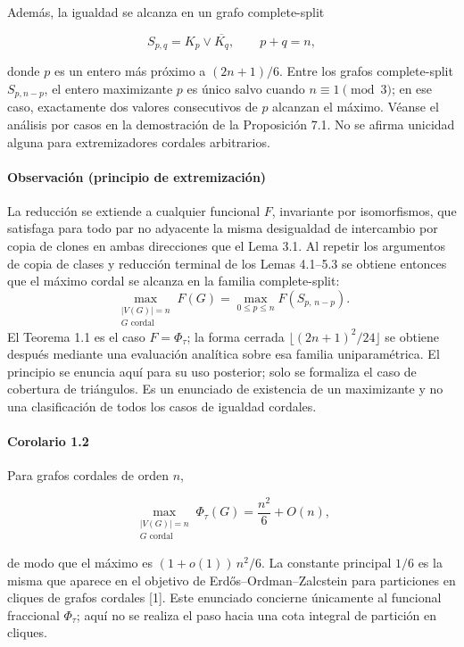 \documentclass[spanish,11pt,a4paper]{article}
\begin{document}
Además, la igualdad se alcanza en un grafo complete-split

\[
S_{p,q}=K_p\vee\overline{K_q},
\qquad
p+q=n,
\]

donde \(p\) es un entero más próximo a \((2n+1)/6\). Entre los grafos
complete-split \(S_{p,n-p}\), el entero maximizante \(p\) es único salvo
cuando \(n\equiv1\pmod3\); en ese caso, exactamente dos valores
consecutivos de \(p\) alcanzan el máximo. Véanse el análisis por casos
en la demostración de la Proposición 7.1. No se afirma unicidad alguna
para extremizadores cordales arbitrarios.

\paragraph{Observación (principio de
extremización)}\label{observaciuxf3n-principio-de-extremizaciuxf3n}

La reducción se extiende a cualquier funcional \(F\), invariante por
isomorfismos, que satisfaga para todo par no adyacente la misma
desigualdad de intercambio por copia de clones en ambas direcciones que
el Lema 3.1. Al repetir los argumentos de copia de clases y reducción
terminal de los Lemas 4.1--5.3 se obtiene entonces que el máximo cordal
se alcanza en la familia complete-split: \[
\max_{\substack{|V(G)|=n\\ G\text{ cordal}}}F(G)=\max_{0\le p\le n}F(S_{p,\,n-p}).
\] El Teorema 1.1 es el caso \(F=\Phi_\tau\); la forma cerrada
\(\lfloor(2n+1)^2/24\rfloor\) se obtiene después mediante una evaluación
analítica sobre esa familia uniparamétrica. El principio se enuncia aquí
para su uso posterior; solo se formaliza el caso de cobertura de
triángulos. Es un enunciado de existencia de un maximizante y no una
clasificación de todos los casos de igualdad cordales.

\paragraph{Corolario 1.2}\label{corolario-1.2}

Para grafos cordales de orden \(n\),

\[
\max_{\substack{|V(G)|=n\\G\text{ cordal}}}\Phi_\tau(G)=\frac{n^2}{6}+O(n),
\]

de modo que el máximo es \((1+o(1))\,n^2/6\). La constante principal
\(1/6\) es la misma que aparece en el objetivo de
Erdős--Ordman--Zalcstein para particiones en cliques de grafos cordales
{[}1{]}. Este enunciado concierne únicamente al funcional fraccional
\(\Phi_\tau\); aquí no se realiza el paso hacia una cota integral de
partición en cliques.
\end{document}
